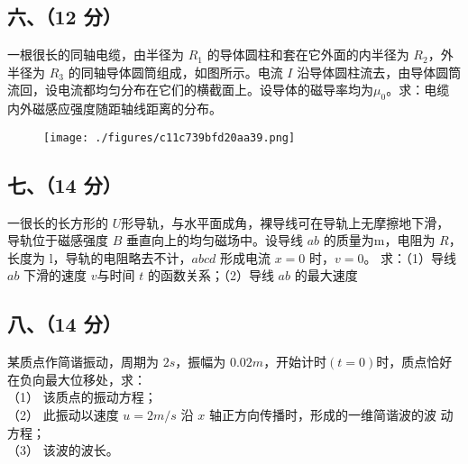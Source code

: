 \subsection{六、（12 分）}
一根很长的同轴电缆，由半径为 $R_1$ 的导体圆柱和套在它外面的内半径为 $R_2$，外半径为 $R_3$ 的同轴导体圆筒组成，如图所示。电流 $I$ 沿导体圆柱流去，由导体圆筒流回，设电流都均匀分布在它们的横截面上。设导体的磁导率均为$\mu_0$。求：电缆内外磁感应强度随距轴线距离的分布。
\begin{figure}[ht]
\centering
\texttt{[image: ./figures/c11c739bfd20aa39.png]}
\caption{} \label{fig_NJUD2_8}
\end{figure}
\subsection{七、（14 分）}
一很长的长方形的 $U$形导轨，与水平面成角，裸导线可在导轨上无摩擦地下滑，导轨位于磁感强度 $B$ 垂直向上的均匀磁场中。设导线 $ab$ 的质量为m，电阻为 $R$，长度为 l，导轨的电阻略去不计，$abcd$ 形成电流 $x=0$ 时，$v=0$。
求：（1）导线 $ab$ 下滑的速度 $v$与时间 $t$ 的函数关系；（2）导线 $ab$ 的最大速度
\subsection{八、（14 分）}
某质点作简谐振动，周期为 $2s$，振幅为 $0.02m$，开始计时$(t=0)$时，质点恰好在负向最大位移处，求：\\
（1） 该质点的振动方程；\\
（2） 此振动以速度 $u=2m/s$ 沿 $x$ 轴正方向传播时，形成的一维简谐波的波
动方程；\\
（3） 该波的波长。